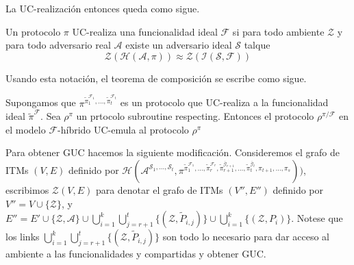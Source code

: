 La UC-realización entonces queda como sigue.

\begin{definicion}
Un protocolo $\pi$ UC-realiza una funcionalidad ideal $\mathcal{F}$ si para todo ambiente
$\mathcal{Z}$ y para todo adversario real $\mathcal{A}$ existe un adversario ideal $\mathcal{S}$
talque
$$\mathcal{Z}(\mathcal{H}(\mathcal{A},\pi))
\approx
\mathcal{Z}(\mathcal{I}(\mathcal{S},\mathcal{F}))$$
\end{definicion}

Usando esta notación, el teorema de composición se escribe como sigue.

\begin{teorema}
Supongamos que
$\pi^{
    \tilde{\pi}_1^{\mathcal{F}_1},
    \ldots,
    \tilde{\pi}_t^{\mathcal{F}_t}}$
es un protocolo que UC-realiza a la funcionalidad ideal $\tilde{\pi}^{\mathcal{F}}$. Sea $\rho^\pi$
un prtocolo subroutine respecting. Entonces el protocolo
$\rho^{\pi/\mathcal{F}}$ en el modelo $\mathcal{F}$-híbrido UC-emula al protocolo $\rho^\pi$
\end{teorema}

Para obtener GUC hacemos la siguiente modificación. Consideremos el grafo de ITMs $(V, E)$ 
definido por
$\mathcal{H}(
    \mathcal{A}^{\mathcal{S}_1, \ldots, \mathcal{S}_t},
    \pi^{
        \tilde{\pi}_1^{\mathcal{F}_1},
        \ldots,
        \tilde{\pi}_r^{\mathcal{F}_r},
        \tilde{\pi}_{r+1}^{\bar{\mathcal{G}}_{r+1}},
        \ldots,
        \tilde{\pi}_t^{\bar{\mathcal{G}}_t},
        \pi_{t+1},
        \ldots,
        \pi_s}))$,
escribimos $\mathcal{Z}(V, E)$ para denotar el grafo de ITMs $(V'', E'')$ definido por $V'' = V \cup
\{\mathcal{Z}\}$, y $E'' = E' \cup \{\mathcal{Z}, \mathcal{A}\} \cup \bigcup_{i=1}^k
\bigcup_{j=r+1}^t \{(\mathcal{Z}, \tilde{P}_{i,j})\} \cup \bigcup_{i=1}^k \{(\mathcal{Z}, P_i)\}$.
Notese que los links $\bigcup_{i=1}^k \bigcup_{j=r+1}^t \{(\mathcal{Z}, \tilde{P}_{i,j})\}$ son todo
lo necesario para dar acceso al ambiente a las funcionalidades y compartidas y obtener GUC.

